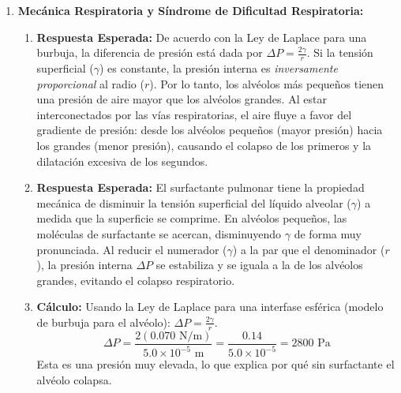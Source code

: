 \documentclass[11pt,letterpaper]{article}
\begin{document}
\begin{enumerate}[leftmargin=*]
    \item \textbf{Mecánica Respiratoria y Síndrome de Dificultad Respiratoria:}
    \begin{enumerate}
        \item \textbf{Respuesta Esperada:} De acuerdo con la Ley de Laplace para una burbuja, la diferencia de presión está dada por $\Delta P = \frac{2\gamma}{r}$. Si la tensión superficial ($\gamma$) es constante, la presión interna es \textit{inversamente proporcional} al radio ($r$). Por lo tanto, los alvéolos más pequeños tienen una presión de aire mayor que los alvéolos grandes. Al estar interconectados por las vías respiratorias, el aire fluye a favor del gradiente de presión: desde los alvéolos pequeños (mayor presión) hacia los grandes (menor presión), causando el colapso de los primeros y la dilatación excesiva de los segundos.
        \item \textbf{Respuesta Esperada:} El surfactante pulmonar tiene la propiedad mecánica de disminuir la tensión superficial del líquido alveolar ($\gamma$) a medida que la superficie se comprime. En alvéolos pequeños, las moléculas de surfactante se acercan, disminuyendo $\gamma$ de forma muy pronunciada. Al reducir el numerador ($\gamma$) a la par que el denominador ($r$), la presión interna $\Delta P$ se estabiliza y se iguala a la de los alvéolos grandes, evitando el colapso respiratorio.
        \item \textbf{Cálculo:} Usando la Ley de Laplace para una interfase esférica (modelo de burbuja para el alvéolo): $\Delta P = \frac{2\gamma}{r}$.
        \[ \Delta P = \frac{2(0.070 \text{ N/m})}{5.0 \times 10^{-5} \text{ m}} = \frac{0.14}{5.0 \times 10^{-5}} = 2800 \text{ Pa} \]
        Esta es una presión muy elevada, lo que explica por qué sin surfactante el alvéolo colapsa.
    \end{enumerate}

    \vspace{0.2cm}


\end{enumerate}
\end{document}

